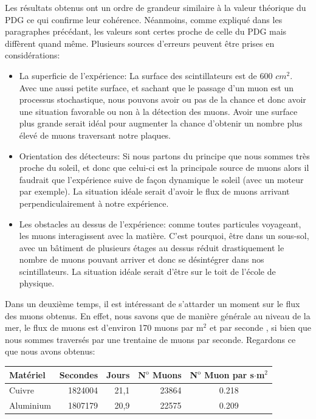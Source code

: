 \documentclass[12pt]{article}
\begin{document}
Les résultats obtenus ont un ordre de grandeur similaire à la valeur théorique du PDG ce qui confirme leur cohérence. Néanmoins, comme expliqué dans les paragraphes précédant, les valeurs sont certes proche de celle du PDG mais diffèrent quand même. Plusieurs sources d'erreurs peuvent être prises en considérations: 

\begin{itemize}
    \item La superficie de l'expérience: La surface des scintillateurs est de 600 $cm^{2}$. Avec une aussi petite surface, et sachant que le passage d'un muon est un processus stochastique, nous pouvons avoir ou pas de la chance et donc avoir une situation favorable ou non à la détection des muons. Avoir une surface plus grande serait idéal pour augmenter la chance d'obtenir un nombre plus élevé de muons traversant notre plaques. 
    
    \item Orientation des détecteurs: Si nous partons du principe que nous sommes très proche du soleil, et donc que celui-ci est la principale source de muons alors il faudrait que l'expérience suive de façon dynamique le soleil (avec un moteur par exemple). La situation idéale serait d'avoir le flux de muons arrivant perpendiculairement à notre expérience.
    
    \item Les obstacles au dessus de l'expérience: comme toutes particules voyageant, les muons interagissent avec la matière. C'est pourquoi, être dans un sous-sol, avec un bâtiment de plusieurs étages au dessus réduit drastiquement le nombre de muons pouvant arriver et donc se désintégrer dans nos scintillateurs. La situation idéale serait d'être sur le toit de l'école de physique.
    
\end{itemize}

Dans un deuxième temps, il est intéressant de s'attarder un moment sur le flux des muons obtenus. En effet, nous savons que de manière générale au niveau de la mer, le flux de muons est d’environ 170 muons par m$^{2}$ et par seconde \cite{noauthor_radioactivite_nodate}, si bien que nous sommes traversés par une trentaine de muons par seconde. Regardons ce que nous avons obtenus: 

\begin{center}
\begin{tabular}{lrrrc}
     Matériel & Secondes & Jours & N$^{\text{o}}$ Muons & N$^{\text{o}}$ Muon par s$\cdot$m$^2$\\
     \hline
     Cuivre &  1824004 & 21,1 & 23864 & 0.218 \\
     Aluminium & 1807179 & 20,9 & 22575 & 0.209 \\
\end{tabular}
\end{center}
\end{document}

